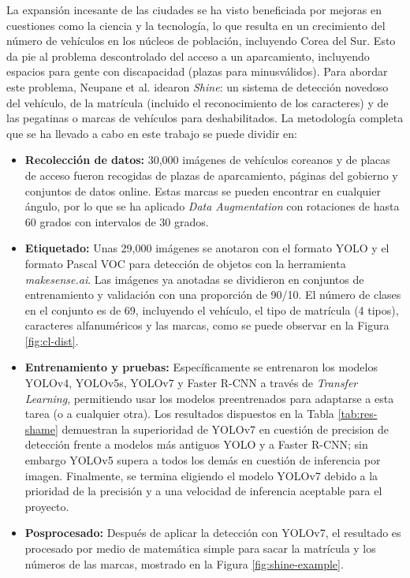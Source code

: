 \documentclass[12pt,a4paper,onecolumn,oneside]{report}
\begin{document}
La expansión incesante de las ciudades se ha visto beneficiada por mejoras en cuestiones como la ciencia y la tecnología, lo que resulta en un crecimiento del número de vehículos en los núcleos de población, incluyendo Corea del Sur. Esto da pie al problema descontrolado del acceso a un aparcamiento, incluyendo espacios para gente con discapacidad (plazas para minusválidos). Para abordar este problema, Neupane et al. \cite{neupane2023shinedeeplearningbasedaccessible} idearon \textit{Shine}: un sistema de detección novedoso del vehículo, de la matrícula (incluido el reconocimiento de los caracteres) y de las pegatinas o marcas de vehículos para deshabilitados. La metodología completa que se ha llevado a cabo en este trabajo se puede dividir en:
\begin{itemize}
    \item \textbf{Recolección de datos:} 30,000 imágenes de vehículos coreanos y de placas de acceso fueron recogidas de plazas de aparcamiento, páginas del gobierno y conjuntos de datos online. Estas marcas se pueden encontrar en cualquier ángulo, por lo que se ha aplicado \textit{Data Augmentation} con rotaciones de hasta 60 grados con intervalos de 30 grados. 
    \item \textbf{Etiquetado:} Unas 29,000 imágenes se anotaron con el formato YOLO y el formato Pascal VOC para detección de objetos con la herramienta \textit{makesense.ai}. Las imágenes ya anotadas se dividieron en conjuntos de entrenamiento y validación con una proporción de 90/10. El número de clases en el conjunto es de 69, incluyendo el vehículo, el tipo de matrícula (4 tipos), caracteres alfanuméricos y las marcas, como se puede observar en la Figura \ref{fig:cl-dist}.
    \item \textbf{Entrenamiento y pruebas:}  Específicamente se entrenaron los modelos YOLOv4, YOLOv5s, YOLOv7 y Faster R-CNN a través de \textit{Transfer Learning}, permitiendo usar los modelos preentrenados para adaptarse a esta tarea (o a cualquier otra). Los resultados dispuestos en la Tabla \ref{tab:res-shame} demuestran la superioridad de YOLOv7 en cuestión de precision de detección frente a modelos más antiguos YOLO y a Faster R-CNN; sin embargo YOLOv5 supera a todos los demás en cuestión de inferencia por imagen. Finalmente, se termina eligiendo el modelo YOLOv7 debido a la prioridad de la precisión y a una velocidad de inferencia aceptable para el proyecto. 
    \item \textbf{Posprocesado:} Después de aplicar la detección con YOLOv7, el resultado es procesado por medio de matemática simple para sacar la matrícula y los números de las marcas, mostrado en la Figura \ref{fig:shine-example}.
\end{itemize}
\end{document}

